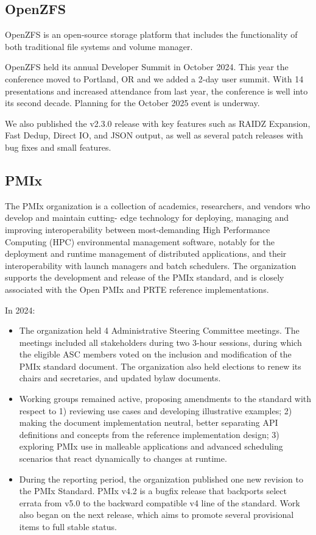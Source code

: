 \documentclass[a4paper]{report}
\begin{document}
\subsection{OpenZFS}

OpenZFS is an open-source storage platform that includes the functionality of both traditional file systems and volume manager.

OpenZFS held its annual Developer Summit in October 2024.  This year the conference moved to Portland, OR and we added a 2-day user summit. With 14 presentations and increased attendance from last year, the conference is well into its second decade. Planning for the October 2025 event is underway.

We also published the v2.3.0 release with key features such as RAIDZ Expansion, Fast Dedup, Direct IO, and JSON output, as well as several patch releases with bug fixes and small features.

\subsection{PMIx}

The PMIx organization is a collection of academics, researchers, and vendors who develop and maintain cutting- edge technology for deploying, managing and improving interoperability between most-demanding High Performance Computing (HPC) environmental management software, notably for the deployment and runtime management of distributed applications, and their interoperability with launch managers and batch schedulers. The organization supports the development and release of the PMIx standard, and is closely associated with the Open PMIx and PRTE reference implementations.

In 2024:

\begin{itemize}

\item The organization held 4 Administrative Steering Committee meetings. The meetings included all stakeholders during two 3-hour sessions, during which the eligible ASC members voted on the inclusion and modification of the PMIx standard document. The organization also held elections to renew its chairs and secretaries, and updated bylaw documents.

\item Working groups remained active, proposing amendments to the standard with respect to 1) reviewing use cases and developing illustrative examples; 2) making the document implementation neutral, better separating API definitions and concepts from the reference implementation design; 3) exploring PMIx use in malleable applications and advanced scheduling scenarios that react dynamically to changes at runtime.

\item During the reporting period, the organization published one new revision to the PMIx Standard. PMIx v4.2 is a bugfix release that backports select errata from v5.0 to the backward compatible v4 line of the standard. Work also began on the next release, which aims to promote several provisional items to full stable status.

\end{itemize}
\end{document}
